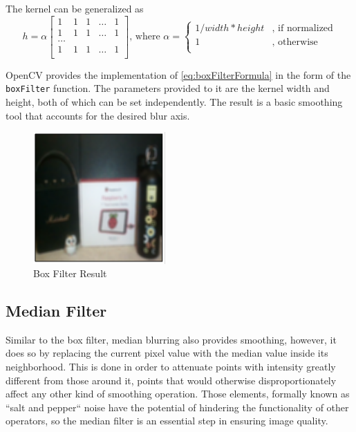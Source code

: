 The kernel can be generalized as \cite{opencvImproc}
\begin{equation}
	\label{eq:boxFilterFormula}
	h = \alpha
	\begin{bmatrix}
		1 & 1 & 1 & \dots & 1 \\
		1 & 1 & 1 & \dots & 1 \\
		\dots                 \\
		1 & 1 & 1 & \dots & 1 \\
	\end{bmatrix}
	\text{, where }
	\alpha =
	\begin{cases}
		1 / width * height & \text{, if normalized} \\
		1                  & \text{, otherwise}     \\
	\end{cases}
\end{equation}

OpenCV provides the implementation of \cref{eq:boxFilterFormula} in the form of the \verb|boxFilter| function.
The parameters provided to it are the kernel width and height, both of which can be set independently. The
result is a basic smoothing tool that accounts for the desired blur axis.

\begin{figure}[H]
	\includegraphics[width=0.45\textwidth, height=0.45\textwidth]{resources/Box_2.png}
	\caption{Box Filter Result}
\end{figure}

\subsection{Median Filter}

Similar to the box filter, median blurring also provides smoothing, however, it does so by replacing the
current pixel value with the median value inside its neighborhood. This is done in order to attenuate points
with intensity greatly different from those around it, points that would otherwise disproportionately affect
any other kind of smoothing operation. Those elements, formally known as ``salt and pepper`` noise have the
potential of hindering the functionality of other operators, so the median filter is an essential step in
ensuring image quality. \cite{fipBerkley}

